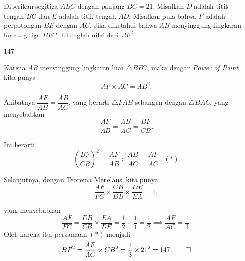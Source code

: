 \documentclass[12pt]{scrartcl}
\begin{document}
	\begin{soaljawab}
		Diberikan segitiga $ABC$ dengan panjang $BC = 21$. Misalkan $D $ adalah titik tengah
		$BC $ dan $E $ adalah titik tengah $AD$. Misalkan pula bahwa $F $ adalah perpotongan $BE$
		dengan $AC$. Jika diketahui bahwa $AB $ menyinggung lingkaran luar segitiga $BFC$,
		hitunglah nilai dari $BF^2$.
		
		\begin{jawaban}
		147
		\end{jawaban}
		\begin{solusi}
		Karena $AB$ menyinggung lingkaran luar $\triangle BFC$, maka dengan \textit{Power of Point} kita punya 
        $$AF \times AC = AB^2.$$ 
        
        Akibatnya $\dfrac{AF}{AB}=\dfrac{AB}{AC}$, yang berarti $\triangle FAB$ sebangun dengan $\triangle BAC$, yang menyebabkan 
        $$\dfrac{AF}{AB}=\dfrac{AB}{AC}=\dfrac{BF}{CB}.$$ 
        
        Ini berarti $$\left(\dfrac{BF}{CB}\right)^2=\dfrac{AF}{AB}\times\dfrac{AB}{AC}=\dfrac{AF}{AC}\dots(*)$$ 
        
        Selanjutnya, dengan Teorema Menelaus, kita punya $$\dfrac{AF}{FC}\times\dfrac{CB}{DB}\times\dfrac{DE}{EA}=1,$$ 
        
        yang menyebabkan 
        $$\dfrac{AF}{FC}=\dfrac{DB}{CB}\times\dfrac{EA}{DE}=\dfrac{1}{2}\times\dfrac{1}{1}=\dfrac{1}{2} \implies \dfrac{AF}{AC} = \dfrac{1}{3}.$$ Oleh karena itu, persamaan $(*)$ menjadi $$BF^2=\dfrac{AF}{AC}\times CB^2=\dfrac{1}{3}\times 21^2=147.\qed $$ 
		\end{solusi}
	\end{soaljawab}
\end{document}
